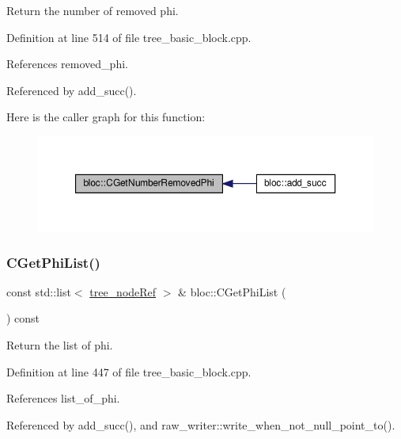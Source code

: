 Return the number of removed phi. 



Definition at line 514 of file tree\+\_\+basic\+\_\+block.\+cpp.



References removed\+\_\+phi.



Referenced by add\+\_\+succ().

Here is the caller graph for this function\+:
\nopagebreak
\begin{figure}[H]
\begin{center}
\leavevmode
\includegraphics[width=350pt]{d6/df6/structbloc_a2e3a87383a8f5cb319bfaaa11fcfefd7_icgraph}
\end{center}
\end{figure}
\mbox{\label{structbloc_aad212d08adb1634e15b4c0bcb31392b2}} 
\subsubsection{\texorpdfstring{C\+Get\+Phi\+List()}{CGetPhiList()}}
{\footnotesize\ttfamily const std\+::list$<$ \hyperlink{tree__node_8hpp_a6ee377554d1c4871ad66a337eaa67fd5}{tree\+\_\+node\+Ref} $>$ \& bloc\+::\+C\+Get\+Phi\+List (\begin{DoxyParamCaption}{ }\end{DoxyParamCaption}) const}



Return the list of phi. 



Definition at line 447 of file tree\+\_\+basic\+\_\+block.\+cpp.



References list\+\_\+of\+\_\+phi.



Referenced by add\+\_\+succ(), and raw\+\_\+writer\+::write\+\_\+when\+\_\+not\+\_\+null\+\_\+point\+\_\+to().

